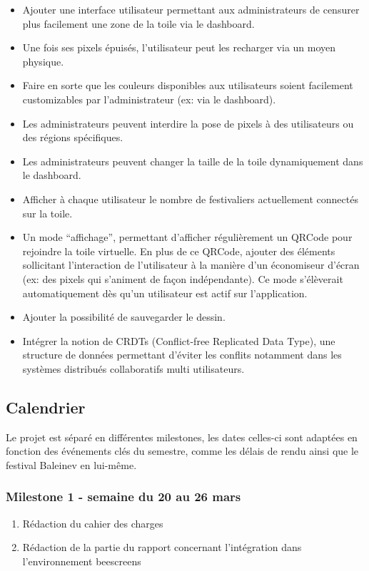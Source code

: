 \begin{itemize}
  \item Ajouter une interface utilisateur permettant aux administrateurs de censurer plus facilement une zone de la toile via le dashboard.
  \item Une fois ses pixels épuisés, l'utilisateur peut les recharger via un moyen physique.
  \item Faire en sorte que les couleurs disponibles aux utilisateurs soient facilement customizables par l'administrateur (ex: via le dashboard).
  \item Les administrateurs peuvent interdire la pose de pixels à des utilisateurs ou des régions spécifiques.
  \item Les administrateurs peuvent changer la taille de la toile dynamiquement dans le dashboard.
  \item Afficher à chaque utilisateur le nombre de festivaliers actuellement connectés sur la toile.
  \item Un mode “affichage”, permettant d'afficher régulièrement un QRCode pour rejoindre la toile virtuelle. En plus de ce QRCode, ajouter des éléments sollicitant l'interaction de l'utilisateur à la manière d'un économiseur d'écran (ex: des pixels qui s'animent de façon indépendante). Ce mode s'élèverait automatiquement dès qu'un utilisateur est actif sur l'application.
  \item Ajouter la possibilité de sauvegarder le dessin.
  \item Intégrer la notion de CRDTs (Conflict-free Replicated Data Type), une structure de données permettant d'éviter les conflits notamment dans les systèmes distribués collaboratifs multi utilisateurs.
\end{itemize}

\subsection{Calendrier}

Le projet est séparé en différentes milestones, les dates celles-ci sont adaptées en fonction des événements clés du semestre, comme les délais de rendu ainsi que le festival Baleinev en lui-même.

\subsubsection{Milestone 1 - semaine du 20 au 26 mars}

\begin{enumerate}
  \item Rédaction du cahier des charges
  \item Rédaction de la partie du rapport concernant l'intégration dans l'environnement \gls{beescreens}
\end{enumerate}

